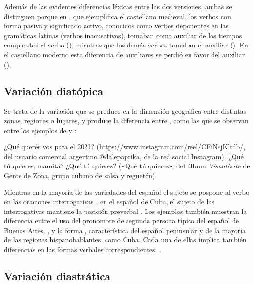 Además de las evidentes diferencias léxicas entre las dos versiones, ambas se
distinguen porque en , que ejemplifica el castellano
medieval, los verbos con forma pasiva y significado activo, conocidos como
verbos deponentes en las gramáticas latinas (verbos inacusativos), tomaban como
auxiliar de los tiempos compuestos el verbo  (), mientras que los demás verbos tomaban el auxiliar 
(). En el castellano moderno  esta
diferencia de auxiliares se perdió en favor del auxiliar 
().

\subsection{Variación diatópica}

Se trata de la variación que se produce en la dimensión geográfica entre
distintas zonas, regiones o lugares, y produce la diferencia entre
, como las que se observan entre los ejemplos de
 y :

\begin{exe}
  \ex\label{ex:02-queres} ¿Qué querés vos para el 2021?
      (\url{https://www.instagram.com/reel/CFiNsjKltdb/}, del usuario comercial
      argentino @dalepaprika, de la red social Instagram).
  \ex\label{ex:02-quetu} ¿Qué tú quieres, mamita? ¿Qué tú quieres? («Qué tú
      quieres», del álbum \textit{Visualízate} de Gente de Zona, grupo cubano de
      salsa y reguetón).
\end{exe}

Mientras en la mayoría de las variedades del español el sujeto se pospone al
verbo en las oraciones interrogativas , en el español de
Cuba, el sujeto de las interrogativas mantiene la posición preverbal
. Los ejemplos también muestran la diferencia entre el uso
del pronombre de segunda persona típico del español de Buenos Aires,
, y la forma , característica del español peninsular y de
la mayoría de las regiones hispanohablantes, como Cuba. Cada una de ellas
implica también diferencias en las formas verbales correspondientes:
.

\subsection{Variación diastrática}

